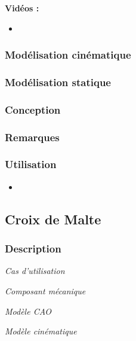 \documentclass[11pt,oneside]{article}
\begin{document}
\textbf{Vidéos :}
\begin{itemize}
\item
\end{itemize}

\subsubsection{Modélisation cinématique}
\subsubsection{Modélisation statique}
\subsubsection{Conception}
\subsubsection{Remarques}
\subsubsection{Utilisation}
\begin{itemize}
\item
\end{itemize}
\newpage

\subsection{Croix de Malte}
\subsubsection{Description}

\begin{center}
\hfill
\begin{minipage}[c]{.21\linewidth}
\begin{center}
\textit{Cas d'utilisation}
\end{center}
\end{minipage} \hfill
\begin{minipage}[c]{.21\linewidth}
\begin{center}
\textit{Composant mécanique}
\end{center}
\end{minipage} \hfill
\begin{minipage}[c]{.21\linewidth}
\begin{center}
\textit{Modèle CAO}
\end{center} 
\end{minipage}\hfill
\begin{minipage}[c]{.21\linewidth}
\begin{center}
\textit{Modèle cinématique}
\end{center} 
\end{minipage}\hfill
\end{center}
\end{document}
